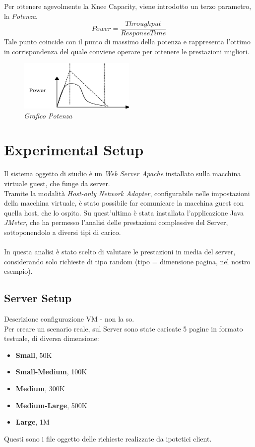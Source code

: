 Per ottenere agevolmente la Knee Capacity, viene introdotto un terzo parametro, la \textit{Potenza}. 
\\
\begin{equation}
	Power = \frac{Throughput}{Response Time}
\end{equation}
Tale punto coincide con il punto di massimo della potenza e rappresenta l'ottimo in corrispondenza del quale conviene operare per ottenere le prestazioni migliori.
\begin{figure}[H]
	\centering
	\includegraphics[width=0.5\textwidth]{img/hw2/Power.png}
	\caption{\textit{Grafico Potenza}}
\end{figure}


\section{Experimental Setup}
Il sistema oggetto di studio è un \textit{Web Server Apache} installato sulla macchina virtuale guest, che funge da server.
\\
Tramite la modalità \textit{Host-only Network Adapter}, configurabile nelle impostazioni della macchina virtuale, è stato possibile far comunicare la macchina guest con quella host, che lo ospita. Su quest'ultima è stata installata l'applicazione Java \textit{JMeter}, che ha permesso l'analisi delle prestazioni complessive del Server, sottoponendolo a diversi tipi di carico.
\\
\\
In questa analisi è stato scelto di valutare le prestazioni in media del server, considerando solo richieste di tipo random (tipo = dimensione pagina, nel nostro esempio). 
\subsection{Server Setup}
Descrizione configurazione VM - non la so.
\\
Per creare un scenario reale, sul Server sono state caricate 5 pagine in formato testuale, di diversa dimensione:
\begin{itemize}
	\item \textbf{Small}, 50K
	\item \textbf{Small-Medium}, 100K
	\item \textbf{Medium}, 300K
	\item \textbf{Medium-Large}, 500K
	\item \textbf{Large}, 1M
\end{itemize}
Questi sono i file oggetto delle richieste realizzate da ipotetici client.
